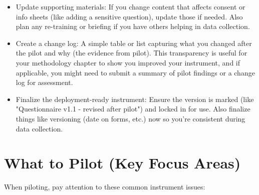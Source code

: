 \documentclass[10pt]{article}
\begin{document}
\begin{itemize}
  \item Update supporting materials: If you change content that affects consent or info sheets (like adding a sensitive question), update those if needed. Also plan any re-training or briefing if you have others helping in data collection.
  \item Create a change log: A simple table or list capturing what you changed after the pilot and why (the evidence from pilot). This transparency is useful for your methodology chapter to show you improved your instrument, and if applicable, you might need to submit a summary of pilot findings or a change log for assessment.
  \item Finalize the deployment-ready instrument: Ensure the version is marked (like "Questionnaire v1.1 - revised after pilot") and locked in for use. Also finalize things like versioning (date on forms, etc.) now so you're consistent during data collection.
\end{itemize}

\section*{What to Pilot (Key Focus Areas)}
When piloting, pay attention to these common instrument issues:
\end{document}
